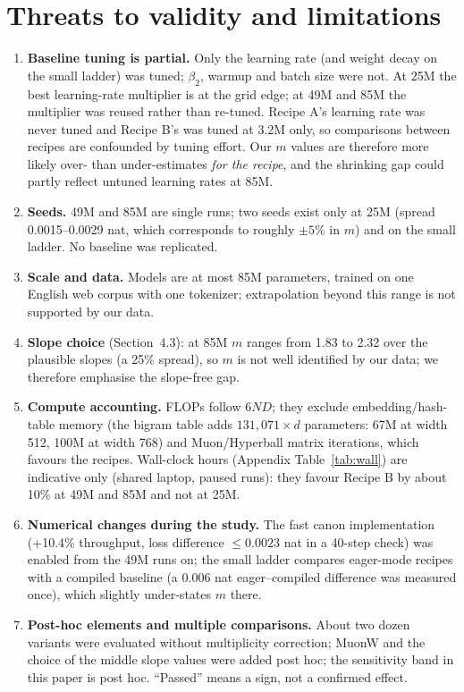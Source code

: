 \documentclass[11pt]{article}
\begin{document}
\section{Threats to validity and limitations}\label{sec:threats}
\begin{enumerate}
\item \textbf{Baseline tuning is partial.} Only the learning rate (and weight decay on the small ladder) was tuned; $\beta_2$, warmup and batch size were not. At 25M the best learning-rate multiplier is at the grid edge; at 49M and 85M the multiplier was reused rather than re-tuned. Recipe A's learning rate was never tuned and Recipe B's was tuned at 3.2M only, so comparisons between recipes are confounded by tuning effort. Our $m$ values are therefore more likely over- than under-estimates \emph{for the recipe}, and the shrinking gap could partly reflect untuned learning rates at 85M.
\item \textbf{Seeds.} 49M and 85M are single runs; two seeds exist only at 25M (spread 0.0015--0.0029 nat, which corresponds to roughly $\pm5\%$ in $m$) and on the small ladder. No baseline was replicated.
\item \textbf{Scale and data.} Models are at most 85M parameters, trained on one English web corpus with one tokenizer; extrapolation beyond this range is not supported by our data.
\item \textbf{Slope choice} (Section~4.3): at 85M $m$ ranges from 1.83 to 2.32 over the plausible slopes (a 25\% spread), so $m$ is not well identified by our data; we therefore emphasise the slope-free gap.
\item \textbf{Compute accounting.} FLOPs follow $6ND$; they exclude embedding/hash-table memory (the bigram table adds $131{,}071\times d$ parameters: 67M at width 512, 100M at width 768) and Muon/Hyperball matrix iterations, which favours the recipes. Wall-clock hours (Appendix Table~\ref{tab:wall}) are indicative only (shared laptop, paused runs): they favour Recipe B by about 10\% at 49M and 85M and not at 25M.
\item \textbf{Numerical changes during the study.} The fast canon implementation (+10.4\% throughput, loss difference $\le0.0023$ nat in a 40-step check) was enabled from the 49M runs on; the small ladder compares eager-mode recipes with a compiled baseline (a 0.006 nat eager--compiled difference was measured once), which slightly under-states $m$ there.
\item \textbf{Post-hoc elements and multiple comparisons.} About two dozen variants were evaluated without multiplicity correction; MuonW and the choice of the middle slope values were added post hoc; the sensitivity band in this paper is post hoc. ``Passed'' means a sign, not a confirmed effect.

\end{enumerate}
\end{document}
